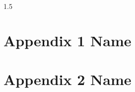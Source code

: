 \documentclass[a4paper, a4paper,12pt]{book}
\begin{document}
\begin{spacing}{1.5}
\mbox{} 
\thispagestyle{empty} 
\clearpage
\thispagestyle{empty}





\newpage 
\mbox{} 
\thispagestyle{empty} 
\clearpage
\thispagestyle{empty}


 
\thispagestyle{empty}


%

%





\appendix
\chapter{Appendix 1 Name}


\chapter{Appendix 2 Name}

	
\end{spacing}
\end{document}
